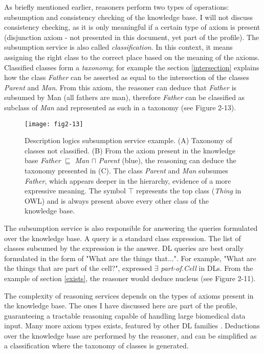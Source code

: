 As briefly mentioned earlier, reasoners perform two types of operations: subsumption and consistency checking of the knowledge base. I will not discuss consistency checking, as it is only meaningful if a certain type of axiom is present (disjunction axiom - not presented in this document, yet part of the  profile). The subsumption service is also called \emph{classification}. In this context, it means assigning the right class to the correct place based on the meaning of the axioms. Classified classes form a \emph{taxonomy}; for example the section \ref{intersection} explains how the class \emph{Father} can be asserted as equal to the intersection of the classes \emph{Parent} and \emph{Man}. From this axiom, the reasoner can deduce that \emph{Father} is subsumed by Man (all fathers are man), therefore \emph{Father} can be classified as subclass of \emph{Man} and represented as such in a taxonomy (see Figure 2-13).

\begin{figure}[ht]
    \centering
    \texttt{[image: fig2-13]}
    \caption{Description logics subsumption service example. (A) Taxonomy of classes not classified. (B) From the axiom present in the knowledge base \emph{Father} $ \sqsubseteq $ \emph{Man} $ \sqcap $ \emph{Parent} (blue), the reasoning can deduce the taxonomy presented in (C). The class \emph{Parent} and \emph{Man} subsumes \emph{Father}, which appears deeper in the hierarchy, evidence of a more expressive meaning. The symbol $ \top $ represents the top class (\emph{Thing} in OWL) and is always present above every other class of the knowledge base.}
    \label{fig2-13}
\end{figure}

The subsumption service is also responsible for answering the queries formulated over the knowledge base. A query is a standard class expression. The list of classes subsumed by the expression is the answer. DL queries are best orally formulated in the form of "What are the things that...". For example, "What are the things that are part of the cell?", expressed $ \exists $ \emph{part-of.Cell} in DLs. From the example of section \ref{exists}, the reasoner would deduce nucleus (see Figure 2-11).

The complexity of reasoning services depends on the types of axioms present in the knowledge base. The ones I have discussed here are part of the  profile, guaranteeing a tractable reasoning capable of handling large biomedical data input. Many more axiom types exists, featured by other DL families \citep{krotzsch2012owl}. Deductions over the knowledge base are performed by the reasoner, and can be simplified as a classification where the taxonomy of classes is generated. 

